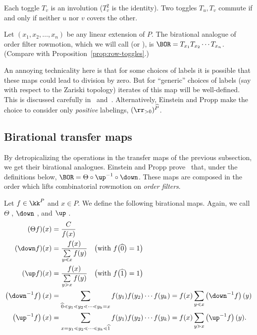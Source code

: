 \begin{prop}\label{prop:BTogO-toggle-inv-commute}
Each toggle $T_v$ is an involution (\ie $T_v^2$ is the identity). Two toggles $T_u,T_v$ commute if and only if neither $u$ nor $v$ covers the other.
\end{prop}

\begin{defi}
Let $(x_1,x_2,\dots,x_n)$ be any linear extension of $P$.
The birational analogue of order filter rowmotion, which we will call
 (or ),
is $\BOR= T_{x_1} T_{x_2} \cdots T_{x_n}$. (Compare with
Proposition~\ref{prop:row-toggles}.)
\end{defi}
An annoying technicality here is that for some choices of labels it is possible that these
maps could lead to division by zero. But for ``generic'' choices of labels (say with respect to the
Zariski topology) iterates of this map will be well-defined. This is discussed
carefully in~\cite[\S~1]{GrRo16} and~\cite[\S~3]{GrRo15}. Alternatively, Einstein and Propp
make the choice to consider only \textit{positive} labelings, \ie $(\rr_{>
0})^{\widehat{P}}$.


\subsection{Birational transfer maps}
By detropicalizing the operations in the transfer maps of the previous subsection, we get
their birational analogues. Einstein and Propp prove~\cite[\S~6]{einpropp} that, under the definitions below,
$\BOR=\Theta\circ\up^{-1}\circ\down$. 
These maps are composed in the order which lifts 
combinatorial rowmotion on \textit{order filters}.


\begingroup 
\allowdisplaybreaks

\begin{defi}\label{def:bir-trans}
Let $f\in \kk^P$ and $x\in P$. We define the following birational maps. 
Again, we call $\Theta$ , $\down$ ,
and $\up$ .
\begin{align*}
 (\Theta f)(x) &= \frac{C}{f(x)}\\
 (\down f)(x) &= \frac{f(x)}{\sum\limits_{y\lessdot x} f(y)} \quad \big(\text{with } f\big(\widehat{0}\big)=1\big)\\
 (\up f)(x) &= 
 \frac{f(x)}{\sum\limits_{y\gtrdot x} f(y)} \quad \big(\text{with } f\big(\widehat{1}\big)=1\big)\\
 \left(\down^{-1}f\right)(x) &=
 \sum_{\widehat{0}\lessdot y_1\lessdot y_2 \lessdot \cdots \lessdot y_k=x} f(y_1)f(y_2)\cdots f(y_k)
 =f(x) \sum\limits_{y\lessdot x}\left(\down^{-1}f\right)(y)\\
 \left(\up^{-1}f\right)(x) &=
 \sum_{x=y_1 \lessdot y_2\lessdot \cdots \lessdot y_k\lessdot \widehat{1}} f(y_1)f(y_2)\cdots f(y_k)
 =f(x) \sum\limits_{y\gtrdot x}\left(\up^{-1}f\right)(y).
\end{align*}
\end{defi}

